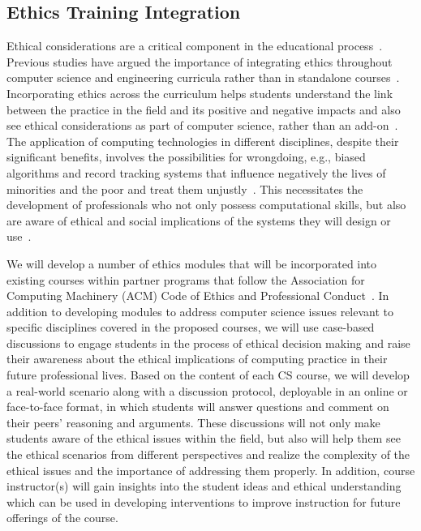 
\subsection{Ethics Training Integration}
Ethical considerations are a critical component in the educational process~\cite{stahl}. Previous studies have argued the importance of integrating ethics throughout computer science and engineering curricula rather than in standalone courses~\cite{newberry,yale-weltz}. Incorporating ethics across the curriculum helps students understand the link between the practice in the field and its positive and negative impacts and also see ethical considerations as part of computer science, rather than an add-on~\cite{newberry, pantazidou, yale-weltz}. The application of computing technologies in different disciplines, despite their significant benefits, involves the possibilities for wrongdoing, e.g., biased algorithms and record tracking systems that influence negatively the lives of minorities and the poor and treat them unjustly~\cite{oneil}. This necessitates the development of professionals who not only possess computational skills, but also are aware of ethical and social implications of the systems they will design or use~\cite{connolly,stahl}.

We will develop a number of ethics modules that will be incorporated into existing courses within partner programs that follow the Association for Computing Machinery (ACM) Code of Ethics and Professional Conduct~\cite{acm-ethics}. In addition to developing modules to address computer science issues relevant to specific disciplines covered in the proposed courses, we will use case-based discussions to engage students in the process of ethical decision making and raise their awareness about the ethical implications of computing practice in their future professional lives. Based on the content of each CS course, we will develop a real-world scenario along with a discussion protocol, deployable in an online or face-to-face format, in which students will answer questions and comment on their peers’ reasoning and arguments. These discussions will not only make students aware of the ethical issues within the field, but also will help them see the ethical scenarios from different perspectives and  realize the complexity of the ethical issues and the importance of addressing them properly. In addition, course instructor(s) will gain insights into the student ideas and ethical understanding which can be used in developing interventions to improve instruction for future offerings of the course.

